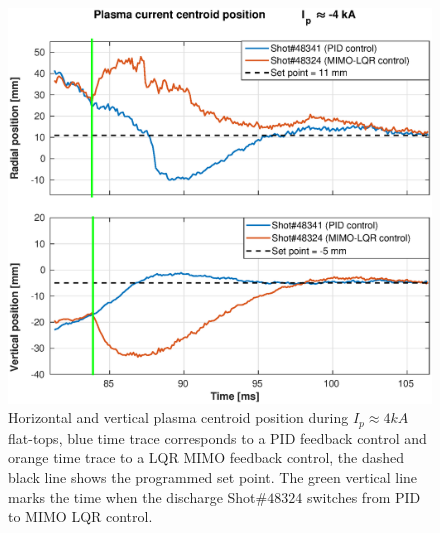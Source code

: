 \begin{figure}[h]
	\centering
	\includegraphics[width=1.1\textwidth]{Chp5/PIDvsMIMO_341_324_2.eps}
	\caption{ Horizontal and vertical plasma centroid position during  $I_p\approx 4kA$  flat-tops, blue time trace corresponds to a PID feedback control and orange time trace to a LQR MIMO feedback control, the dashed black line shows the programmed set point. The green vertical line marks the time  when the  discharge Shot$\# 48324$ switches  from PID to MIMO LQR control.	\label{341_342}}
\end{figure}


